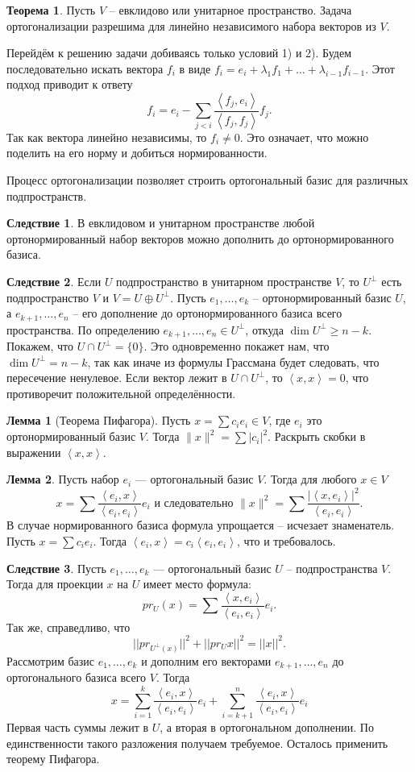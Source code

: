 \documentclass[10pt,a4paper,oneside]{book} %
\theoremstyle{definition}
\newtheorem{thm}{Теорема}
\newtheorem{lem}{Лемма}
\newtheorem{cor}{Следствие}
\def\lan{\left\langle }
\def\ran{\right\rangle}
\def\thrm{\begin{thm}}
\def\ethrm{\end{thm}}
\def\lm{\begin{lem}}
\def\elm{\end{lem}}
\def\crl{\begin{cor}}
\def\ecrl{\end{cor}}
\begin{document}
\thrm Пусть $V$ -- евклидово или унитарное пространство. Задача ортогонализации разрешима для линейно независимого набора векторов из $V$.
\proof

Перейдём к решению задачи добиваясь только условий 1) и 2). Будем последовательно искать вектора $f_i$ в виде $f_i=e_i+\lambda_1 f_1 +\dots + \lambda_{i-1} f_{i-1}$. Этот подход приводит к ответу
$$f_i=e_i-\sum_{j<i} \frac{\lan f_j,e_i\ran}{\lan f_j,f_j\ran}f_j.$$
Так как вектора линейно независимы, то $f_i\neq 0$. Это означает, что можно поделить на его норму и добиться нормированности.
\endproof
\ethrm


Процесс ортогонализации позволяет строить ортогональный базис для различных подпространств.

\crl В евклидовом и унитарном пространстве любой ортонормированный набор векторов можно дополнить до ортонормированного базиса.
\ecrl

\crl Если $U$ подпространство в унитарном пространстве $V$, то $U^{\bot}$ есть подпространство $V$ и  $V= U \oplus U^{\bot}$. 
\proof Пусть $e_1,\dots,e_k$ -- ортонормированный базис $U$, а $e_{k+1}, \dots, e_n$ -- его дополнение до ортонормированного базиса всего пространства. По определению $e_{k+1},\dots,e_n \in U^{\bot}$, откуда $\dim U^{\bot} \geq n-k$. Покажем, что $U\cap U^{\bot}=\{0\}$. Это одновременно покажет нам, что $\dim U^{\bot}=n-k$, так как иначе из формулы Грассмана будет следовать, что пересечение ненулевое.
Если вектор лежит в $U\cap U^{\bot}$, то $\lan x,x\ran=0$, что противоречит положительной определённости.
\endproof
\ecrl

\lm[Теорема Пифагора] Пусть $x= \sum c_i e_i \in V$, где $e_i$ это ортонормированный базис $V$. Тогда $\|x\|^2=\sum |c_i|^2$.
\proof Раскрыть скобки в выражении $\lan x,x\ran$.
\endproof
\elm

\lm Пусть набор $e_i$ --- ортогональный базис $V$. Тогда для любого $x\in V$ 
$$x= \sum \frac{\lan e_i,  x\ran}{\lan e_i, e_i\ran}e_i \text{ и следовательно  } \|x\|^2= \sum \frac{|\lan x, e_i\ran|^2}{\lan e_i, e_i\ran}.$$
 В случае нормированного базиса формула упрощается -- исчезает знаменатель.
\proof Пусть $x=\sum c_i e_i$. Тогда $\lan e_i, x\ran = c_i \lan e_i,e_i \ran$, что и требовалось.
\endproof
\elm



\crl Пусть $ e_1,\dots, e_k$ --- ортогональный базис $U$ -- подпространства $V$. Тогда для проекции $x$ на $U$ имеет место формула:
$$ pr_U(x)= \sum \frac{\lan x,e_i\ran}{\lan e_i,e_i\ran} e_i.$$
Так же, справедливо, что
$$||pr_{U^{\bot}(x)}||^2 + ||pr_U x||^2=||x||^2.$$
\proof Рассмотрим базис $e_1,\dots, e_k$ и дополним его векторами $e_{k+1},\dots,e_n$ до ортогонального базиса всего $V$. Тогда $$x= \sum_{i=1}^k \frac{\lan e_i,  x\ran}{\lan e_i, e_i\ran}e_i + \sum_{i=k+1}^n \frac{\lan e_i,  x\ran}{\lan e_i, e_i\ran}e_i $$
Первая часть суммы лежит в $U$, а вторая в ортогональном дополнении. По единственности такого разложения получаем требуемое. Осталось применить теорему Пифагора.
\endproof
\ecrl
\end{document}

